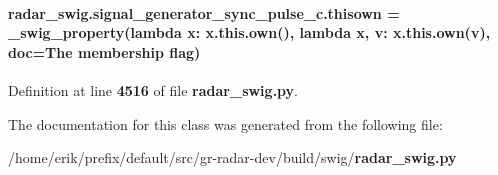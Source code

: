 \paragraph[{thisown}]{\setlength{\rightskip}{0pt plus 5cm}radar\+\_\+swig.\+signal\+\_\+generator\+\_\+sync\+\_\+pulse\+\_\+c.\+thisown = {\bf \+\_\+swig\+\_\+property}(lambda x\+: x.\+this.\+own(), lambda {\bf x}, v\+: x.\+this.\+own(v), doc=\textquotesingle{}The membership flag\textquotesingle{})\hspace{0.3cm}{\ttfamily [static]}}\label{classradar__swig_1_1signal__generator__sync__pulse__c_a15a45ef73284e989ad8fe4ac89bcd0b8}


Definition at line {\bf 4516} of file {\bf radar\+\_\+swig.\+py}.



The documentation for this class was generated from the following file\+:\begin{DoxyCompactItemize}
\item 
/home/erik/prefix/default/src/gr-\/radar-\/dev/build/swig/{\bf radar\+\_\+swig.\+py}\end{DoxyCompactItemize}
